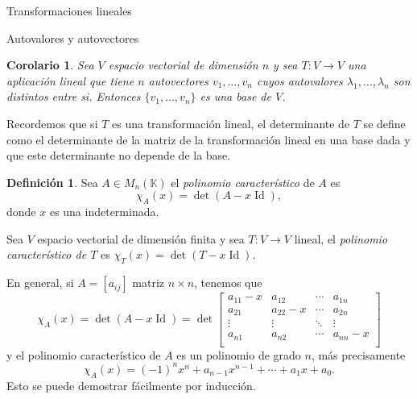 \documentclass[a4paper,12pt,twoside,spanish,reqno]{amsbook}
\newtheorem{corolario}[teorema]{Corolario}
\theoremstyle{definition}
\newtheorem{definicion}{Definici\'on}[section]
\theoremstyle{remark}
\newcommand{\Id}{\operatorname{Id}}
\newcommand{\K}{\mathbb K}
\begin{document}
\begin{chapter}{Transformaciones lineales}
\begin{section}{Autovalores y autovectores}
        \begin{corolario}\label{cor-aut-li}
            Sea $V$ espacio vectorial de dimensión $n$ y sea $T: V \to V$ una aplicación lineal que tiene $n$
            autovectores $v_1,\ldots, v_n$ cuyos autovalores $\lambda_1,\ldots,\lambda_n$ son distintos entre
            si. Entonces $\{v_1,\ldots, v_n\}$ es una base de $V$.
        \end{corolario}
        
        Recordemos que si $T$  es una transformación lineal, el determinante de $T$  se define como el determinante de la matriz de la transformación lineal en una base dada y que este determinante no depende de la base.    
        
        \begin{definicion}
            Sea $A \in M_n(\K)$   el \textit{polinomio característico} de $A$ es $$\chi_A(x) = \det(A-x \Id),$$ donde $x$ es una indeterminada. 
            
            Sea $V$ espacio vectorial de dimensión finita y sea $T: V \to V$ lineal, el  \textit{polinomio característico de $T$} es $\chi_T(x) = \det(T- x \Id)$.
        \end{definicion}
    
            
        En general,  si $A = [a_{ij}]$ matriz $n \times n$, tenemos que
        \begin{equation}
        \chi_A(x) = \det(A- x\Id) = \det
        \begin{bmatrix}
        a_{11}-x&a_{12}&\cdots&a_{1n}\\
        a_{21}&a_{22}-x&\cdots&a_{2n}\\
        \vdots&\vdots&\ddots&\vdots\\
        a_{n1}&a_{n2}&\cdots&a_{nn}-x\\
        \end{bmatrix}
        \end{equation} 
        y el polinomio característico de $A$ es un polinomio  de grado $n$,  más precisamente  
        $$
        \chi_A(x) =(-1)^nx^n + a_{n-1}x^{n-1}+ \cdots + a_1x + a_0.
        $$ 
        Esto se puede demostrar fácilmente por inducción. 
        

\end{section}
\end{chapter}
\end{document}
